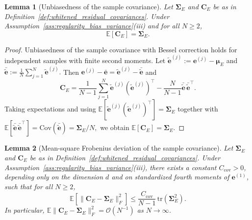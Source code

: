 \documentclass[11pt,a4paper]{article}
\newtheorem{lemma}{Lemma}
\begin{document}
\begin{lemma}[Unbiasedness of the sample covariance]
\label{lem:unbiasedness_sample_cov}
Let $\boldsymbol{\Sigma}_E$ and $\mathbf{C}_E$ be as in Definition~\ref{def:whitened_residual_covariances}. Under Assumption~\ref{ass:regularity_bias_variance}(iii) and for all $N\ge 2$,
\begin{equation}
\mathbb{E}[\mathbf{C}_E]=\boldsymbol{\Sigma}_E.
\end{equation}
\end{lemma}

\begin{proof}
Unbiasedness of the sample covariance with Bessel correction holds for independent samples with finite second moments. Let
\(
\tilde{\mathbf{e}}^{(j)}:=\mathbf{e}^{(j)}-\boldsymbol{\mu}_E
\)
and
\(
\bar{\tilde{\mathbf{e}}}:=\frac{1}{N}\sum_{j=1}^N\tilde{\mathbf{e}}^{(j)}.
\)
Then $\mathbf{e}^{(j)}-\bar{\mathbf{e}}=\tilde{\mathbf{e}}^{(j)}-\bar{\tilde{\mathbf{e}}}$ and
\begin{equation}
\mathbf{C}_E
=
\frac{1}{N-1}\sum_{j=1}^N \tilde{\mathbf{e}}^{(j)}(\tilde{\mathbf{e}}^{(j)})^\top
-
\frac{N}{N-1}\bar{\tilde{\mathbf{e}}}\,\bar{\tilde{\mathbf{e}}}^\top.
\end{equation}
Taking expectations and using
\(
\mathbb{E}[\tilde{\mathbf{e}}^{(j)}(\tilde{\mathbf{e}}^{(j)})^\top]=\boldsymbol{\Sigma}_E
\)
together with
\(
\mathbb{E}[\bar{\tilde{\mathbf{e}}}\,\bar{\tilde{\mathbf{e}}}^\top]
=\mathrm{Cov}(\bar{\tilde{\mathbf{e}}})
=\boldsymbol{\Sigma}_E/N,
\)
we obtain $\mathbb{E}[\mathbf{C}_E]=\boldsymbol{\Sigma}_E$.
\end{proof}


\begin{lemma}[Mean-square Frobenius deviation of the sample covariance]
\label{lem:frobenius_concentration}
Let $\boldsymbol{\Sigma}_E$ and $\mathbf{C}_E$ be as in Definition~\ref{def:whitened_residual_covariances}. Under Assumption~\ref{ass:regularity_bias_variance}(iii), there exists a constant $C_{\mathrm{cov}}>0$, depending only on the dimension $d$ and on standardized fourth moments of $\mathbf{e}^{(1)}$, such that for all $N\ge 2$,
\begin{equation}
\mathbb{E}\!\left[\|\mathbf{C}_E-\boldsymbol{\Sigma}_E\|_F^2\right]
\le
\frac{C_{\mathrm{cov}}}{N-1}\,
\mathrm{tr}\!\left(\boldsymbol{\Sigma}_E^2\right).
\end{equation}
In particular, $\mathbb{E}\|\mathbf{C}_E-\boldsymbol{\Sigma}_E\|_F^2=\mathcal{O}(N^{-1})$ as $N\to\infty$.
\end{lemma}
\end{document}
